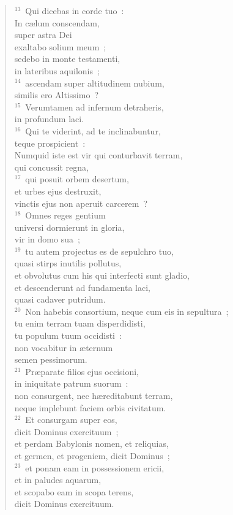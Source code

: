 \begin{flushleft}
\begin{verse}
${}^{13}$~Qui dicebas in corde tuo~:\\ In c\ae lum conscendam,\\ super astra Dei\\ exaltabo solium meum~;\\ sedebo in monte testamenti,\\ in lateribus aquilonis~;\\
${}^{14}$~ascendam super altitudinem nubium,\\ similis ero Altissimo~?\\
${}^{15}$~Verumtamen ad infernum detraheris,\\ in profundum laci.\\
${}^{16}$~Qui te viderint, ad te inclinabuntur,\\ teque prospicient~:\\ Numquid iste est vir qui conturbavit terram,\\ qui concussit regna,\\
${}^{17}$~qui posuit orbem desertum,\\ et urbes ejus destruxit,\\ vinctis ejus non aperuit carcerem~?\\
${}^{18}$~Omnes reges gentium\\ universi dormierunt in gloria,\\ vir in domo sua~;\\
${}^{19}$~tu autem projectus es de sepulchro tuo,\\ quasi stirps inutilis pollutus,\\ et obvolutus cum his qui interfecti sunt gladio,\\ et descenderunt ad fundamenta laci,\\ quasi cadaver putridum.\\
${}^{20}$~Non habebis consortium, neque cum eis in sepultura~;\\ tu enim terram tuam disperdidisti,\\ tu populum tuum occidisti~:\\ non vocabitur in \ae ternum\\ semen pessimorum.\\
${}^{21}$~Pr\ae parate filios ejus occisioni,\\ in iniquitate patrum suorum~:\\ non consurgent, nec h\ae reditabunt terram,\\ neque implebunt faciem orbis civitatum.\\
${}^{22}$~Et consurgam super eos,\\ dicit Dominus exercituum~;\\ et perdam Babylonis nomen, et reliquias,\\ et germen, et progeniem, dicit Dominus~;\\
${}^{23}$~et ponam eam in possessionem ericii,\\ et in paludes aquarum,\\ et scopabo eam in scopa terens,\\ dicit Dominus exercituum.\end{verse}\end{flushleft}


